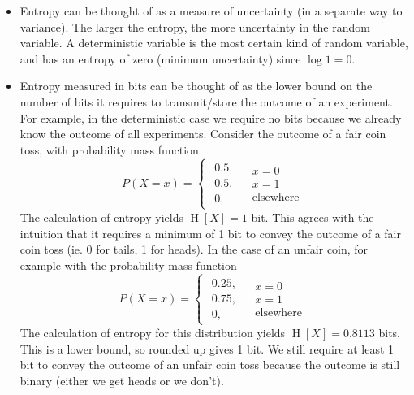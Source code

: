 \documentclass[11pt]{report} %
\begin{document}
\begin{itemize}
\item Entropy can be thought of as a measure of uncertainty (in a separate way to variance). The larger the entropy, the more uncertainty in the random variable. A deterministic variable is the most certain kind of random variable, and has an entropy of zero (minimum uncertainty) since $\log 1 = 0$.
\item Entropy measured in bits can be thought of as the lower bound on the number of bits it requires to transmit/store the outcome of an experiment. For example, in the deterministic case we require no bits because we already know the outcome of all experiments. Consider the outcome of a fair coin toss, with probability mass function
\begin{equation}
P\left(X = x\right) = \begin{cases}
\begin{array}{c}
0.5,\\
0.5,\\
0,
\end{array} & \begin{array}{c}
x=0\\
x=1\\
\text{elsewhere}
\end{array}\end{cases}
\end{equation}
The calculation of entropy yields $\operatorname{H}\left[X\right] = 1$ bit. This agrees with the intuition that it requires a minimum of 1 bit to convey the outcome of a fair coin toss (ie. 0 for tails, 1 for heads). In the case of an unfair coin, for example with the probability mass function
\begin{equation}
P\left(X = x\right) = \begin{cases}
\begin{array}{c}
0.25,\\
0.75,\\
0,
\end{array} & \begin{array}{c}
x=0\\
x=1\\
\text{elsewhere}
\end{array}\end{cases}
\end{equation}
The calculation of entropy for this distribution yields $\operatorname{H}\left[X\right] = 0.8113$ bits. This is a lower bound, so rounded up gives 1 bit. We still require at least 1 bit to convey the outcome of an unfair coin toss because the outcome is still binary (either we get heads or we don't). \\


\end{itemize}
\end{document}
